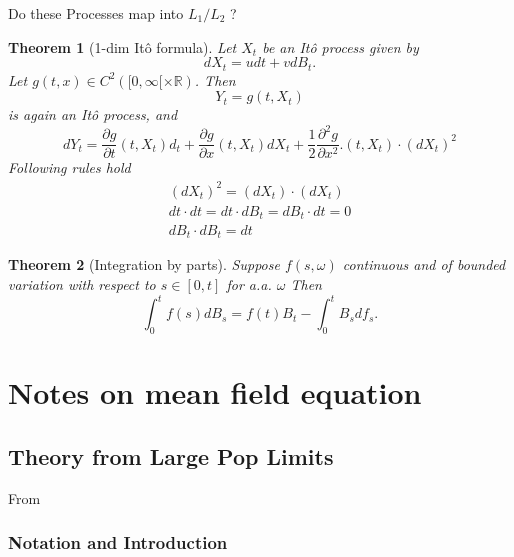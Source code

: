 \documentclass{article}
\newtheorem{theorem}{Theorem}
\begin{document}
Do these Processes map into $L_1/L_2$ ?

\begin{theorem}[1-dim Itô formula]
    Let $X_t$ be an Itô process given by
    \begin{equation}
        dX_t =udt+vdB_t.
    \end{equation}
    Let $g(t,x) \in C^2([0,\infty[ \times \mathbb{R})$. Then 
    \begin{equation}
        Y_t = g(t,X_t)
    \end{equation}
    is again an Itô process, and
    \begin{equation}
        dY_t=\frac{\partial  g}{\partial t}(t,X_t)d_t + \frac{\partial g}{\partial x}(t,X_t)dX_t + \frac{1}{2}\frac{\partial ^2 g}{\partial x^2}.(t,X_t)\cdot(dX_t)^2
    \end{equation}
    Following rules hold
    \begin{gather}
        (dX_t)^2 = (dX_t) \cdot (dX_t) \\
        dt\cdot dt = dt \cdot dB_t = dB_t \cdot dt = 0 \\
        dB_t \cdot dB_t =dt
    \end{gather}
\end{theorem}


\begin{theorem}[Integration by parts]
    Suppose $f(s,\omega)$ continuous and of bounded variation with respect to $s\in[0,t]$ for a.a. $\omega$ Then
    \begin{equation}
        \int_0^tf(s)dB_s=f(t)B_t-\int_0^t B_s df_s .
    \end{equation}
\end{theorem}






\section{Notes on mean field equation}

\subsection{Theory from Large Pop Limits}

From \cite{Luecke2022}

\subsubsection{Notation and Introduction}
\end{document}
